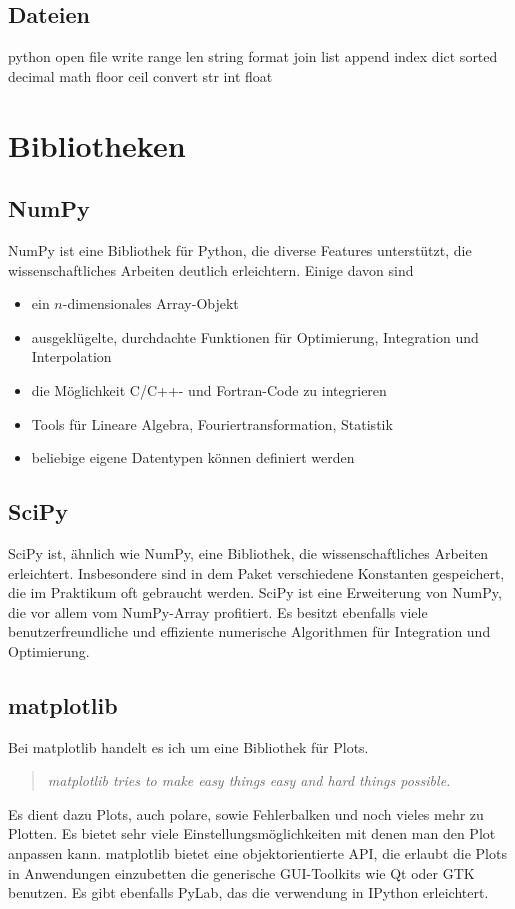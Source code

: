 \subsection{Dateien} 
python
    open
    file
        write
    range
    len
    string
        format
        join
    list
        append
        index
    dict
    sorted
    decimal
    math
        floor
        ceil
    convert
        str
        int
        float

\section{Bibliotheken}
\subsection{NumPy}
NumPy ist eine Bibliothek für Python, die diverse Features unterstützt, die wissenschaftliches Arbeiten deutlich erleichtern.
Einige davon sind
\begin{itemize}
  \item ein $n$-dimensionales Array-Objekt
  \item ausgeklügelte, durchdachte Funktionen für Optimierung, Integration und Interpolation
  \item die Möglichkeit C/C++- und Fortran-Code zu integrieren
  \item Tools für Lineare Algebra, Fouriertransformation, Statistik
  \item beliebige eigene Datentypen können definiert werden
\end{itemize}

\subsection{SciPy}
SciPy ist, ähnlich wie NumPy, eine Bibliothek, die wissenschaftliches Arbeiten erleichtert.
Insbesondere sind in dem Paket verschiedene Konstanten gespeichert, die im Praktikum oft gebraucht werden.
SciPy ist eine Erweiterung von NumPy, die vor allem vom NumPy-Array profitiert.
Es besitzt ebenfalls viele benutzerfreundliche und effiziente numerische Algorithmen für Integration und Optimierung.

\subsection{matplotlib}
Bei matplotlib handelt es ich um eine Bibliothek für Plots.
\begin{quote}
  \textit{matplotlib tries to make easy things easy and hard things possible.}
\end{quote}
Es dient dazu Plots, auch polare, sowie Fehlerbalken und noch vieles mehr zu Plotten.
Es bietet sehr viele Einstellungsmöglichkeiten mit denen man den Plot anpassen kann.
matplotlib bietet eine objektorientierte API, die erlaubt die Plots in Anwendungen einzubetten die generische GUI-Toolkits wie Qt oder GTK benutzen.
Es gibt ebenfalls PyLab, das die verwendung in IPython erleichtert.

